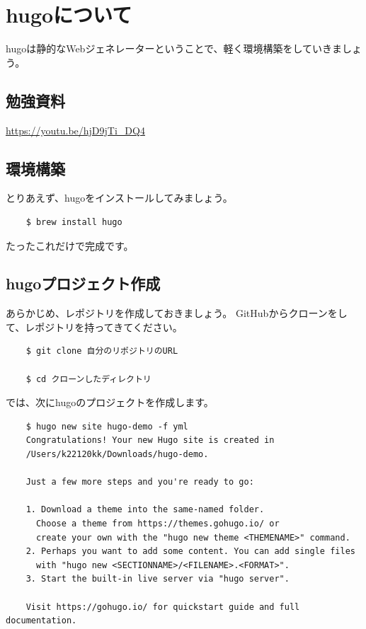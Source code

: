 \chapter{hugoについて}
hugoは静的なWebジェネレーターということで、軽く環境構築をしていきましょう。

\section{勉強資料}
  \url{https://youtu.be/hjD9jTi_DQ4}

\section{環境構築}
とりあえず、hugoをインストールしてみましょう。

  \begin{shaded}
    \begin{verbatim}
    $ brew install hugo
    \end{verbatim}
  \end{shaded}
  たったこれだけで完成です。

\section{hugoプロジェクト作成}
  あらかじめ、レポジトリを作成しておきましょう。
  GitHubからクローンをして、レポジトリを持ってきてください。

  \begin{shaded}
    \begin{verbatim}
    $ git clone 自分のリポジトリのURL

    $ cd クローンしたディレクトリ
    \end{verbatim}
  \end{shaded}

    では、次にhugoのプロジェクトを作成します。

  \begin{shaded}
    \begin{verbatim}
    $ hugo new site hugo-demo -f yml
    Congratulations! Your new Hugo site is created in 
    /Users/k22120kk/Downloads/hugo-demo.

    Just a few more steps and you're ready to go:

    1. Download a theme into the same-named folder.
      Choose a theme from https://themes.gohugo.io/ or
      create your own with the "hugo new theme <THEMENAME>" command.
    2. Perhaps you want to add some content. You can add single files
      with "hugo new <SECTIONNAME>/<FILENAME>.<FORMAT>".
    3. Start the built-in live server via "hugo server".

    Visit https://gohugo.io/ for quickstart guide and full documentation.
    \end{verbatim}
  \end{shaded}

